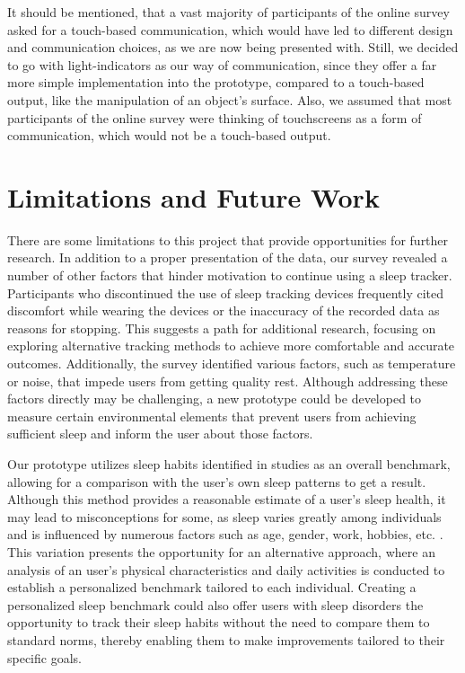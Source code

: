 \documentclass[
  a4paper,  %
  twoside,  %
  bibliography=totoc,
  headsepline,
  cleardoublepage=empty,
  parskip=half,
  draft=false
]{scrbook}
\begin{document}
It should be mentioned, that a vast majority of participants of the online survey asked for a touch-based communication, which would have led to different design and communication choices, as we are now being presented with. Still, we decided to go with light-indicators as our way of communication, since they offer a far more simple implementation into the prototype, compared to a touch-based output, like the manipulation of an object's surface. Also, we assumed that most participants of the online survey were thinking of touchscreens as a form of communication, which would not be a touch-based output.

\section{Limitations and Future Work}
There are some limitations to this project that provide opportunities for further research. In addition to a proper presentation of the data, our survey revealed a number of other factors that hinder motivation to continue using a sleep tracker. Participants who discontinued the use of sleep tracking devices frequently cited discomfort while wearing the devices or the inaccuracy of the recorded data as reasons for stopping. This suggests a path for additional research, focusing on exploring alternative tracking methods to achieve more comfortable and accurate outcomes. Additionally, the survey identified various factors, such as temperature or noise, that impede users from getting quality rest. Although addressing these factors directly may be challenging, a new prototype could be developed to measure certain environmental elements that prevent users from achieving sufficient sleep and inform the user about those factors. 

Our prototype utilizes sleep habits identified in studies as an overall benchmark, allowing for a comparison with the user's own sleep patterns to get a result. Although this method provides a reasonable estimate of a user's sleep health, it may lead to misconceptions for some, as sleep varies greatly among individuals and is influenced by numerous factors such as age, gender, work, hobbies, etc. \cite{patel_physiology_2023}. This variation presents the opportunity for an alternative approach, where an analysis of an user's physical characteristics and daily activities is conducted to establish a personalized benchmark tailored to each individual. Creating a personalized sleep benchmark could also offer users with sleep disorders the opportunity to track their sleep habits without the need to compare them to standard norms, thereby enabling them to make improvements tailored to their specific goals.
\end{document}
